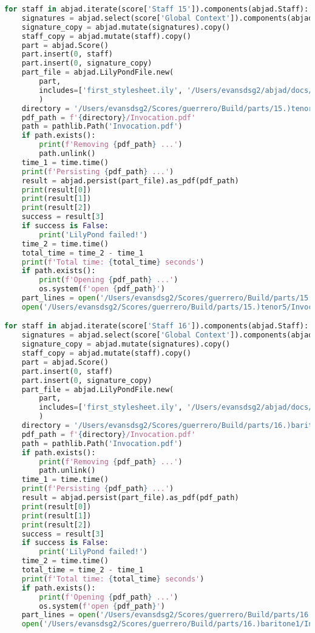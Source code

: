 \begin{lstlisting}[language=Python, caption=Invocation Source Code]
for staff in abjad.iterate(score['Staff 15']).components(abjad.Staff):
    signatures = abjad.select(score['Global Context']).components(abjad.Staff)
    signature_copy = abjad.mutate(signatures).copy()
    staff_copy = abjad.mutate(staff).copy()
    part = abjad.Score()
    part.insert(0, staff)
    part.insert(0, signature_copy)
    part_file = abjad.LilyPondFile.new(
        part,
        includes=['first_stylesheet.ily', '/Users/evansdsg2/abjad/docs/source/_stylesheets/abjad.ily'],
        )
    directory = '/Users/evansdsg2/Scores/guerrero/Build/parts/15.)tenor5'
    pdf_path = f'{directory}/Invocation.pdf'
    path = pathlib.Path('Invocation.pdf')
    if path.exists():
        print(f'Removing {pdf_path} ...')
        path.unlink()
    time_1 = time.time()
    print(f'Persisting {pdf_path} ...')
    result = abjad.persist(part_file).as_pdf(pdf_path)
    print(result[0])
    print(result[1])
    print(result[2])
    success = result[3]
    if success is False:
        print('LilyPond failed!')
    time_2 = time.time()
    total_time = time_2 - time_1
    print(f'Total time: {total_time} seconds')
    if path.exists():
        print(f'Opening {pdf_path} ...')
        os.system(f'open {pdf_path}')
    part_lines = open('/Users/evansdsg2/Scores/guerrero/Build/parts/15.)tenor5/Invocation.ly').readlines()
    open('/Users/evansdsg2/Scores/guerrero/Build/parts/15.)tenor5/Invocation.ly', 'w').writelines(part_lines[15:-1])

for staff in abjad.iterate(score['Staff 16']).components(abjad.Staff):
    signatures = abjad.select(score['Global Context']).components(abjad.Staff)
    signature_copy = abjad.mutate(signatures).copy()
    staff_copy = abjad.mutate(staff).copy()
    part = abjad.Score()
    part.insert(0, staff)
    part.insert(0, signature_copy)
    part_file = abjad.LilyPondFile.new(
        part,
        includes=['first_stylesheet.ily', '/Users/evansdsg2/abjad/docs/source/_stylesheets/abjad.ily'],
        )
    directory = '/Users/evansdsg2/Scores/guerrero/Build/parts/16.)baritone1'
    pdf_path = f'{directory}/Invocation.pdf'
    path = pathlib.Path('Invocation.pdf')
    if path.exists():
        print(f'Removing {pdf_path} ...')
        path.unlink()
    time_1 = time.time()
    print(f'Persisting {pdf_path} ...')
    result = abjad.persist(part_file).as_pdf(pdf_path)
    print(result[0])
    print(result[1])
    print(result[2])
    success = result[3]
    if success is False:
        print('LilyPond failed!')
    time_2 = time.time()
    total_time = time_2 - time_1
    print(f'Total time: {total_time} seconds')
    if path.exists():
        print(f'Opening {pdf_path} ...')
        os.system(f'open {pdf_path}')
    part_lines = open('/Users/evansdsg2/Scores/guerrero/Build/parts/16.)baritone1/Invocation.ly').readlines()
    open('/Users/evansdsg2/Scores/guerrero/Build/parts/16.)baritone1/Invocation.ly', 'w').writelines(part_lines[15:-1])


\end{lstlisting}
